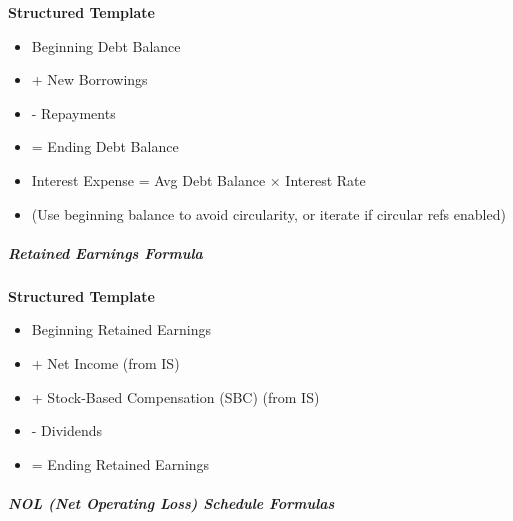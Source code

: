 \documentclass[11pt]{article}
\begin{document}
\textbf{Structured Template}
\begin{itemize}[leftmargin=*,itemsep=2pt,topsep=2pt]
\item {} Beginning Debt Balance
\item {} + New Borrowings
\item {} - Repayments
\item {} = Ending Debt Balance
\item {} Interest Expense = Avg Debt Balance × Interest Rate
\item {} (Use beginning balance to avoid circularity, or iterate if circular refs enabled)
\end{itemize}

\subparagraph{Retained Earnings Formula}\mbox{}\par

\textbf{Structured Template}
\begin{itemize}[leftmargin=*,itemsep=2pt,topsep=2pt]
\item {} Beginning Retained Earnings
\item {} + Net Income (from IS)
\item {} + Stock-Based Compensation (SBC) (from IS)
\item {} - Dividends
\item {} = Ending Retained Earnings
\end{itemize}

\subparagraph{NOL (Net Operating Loss) Schedule Formulas}\mbox{}\par
\end{document}
